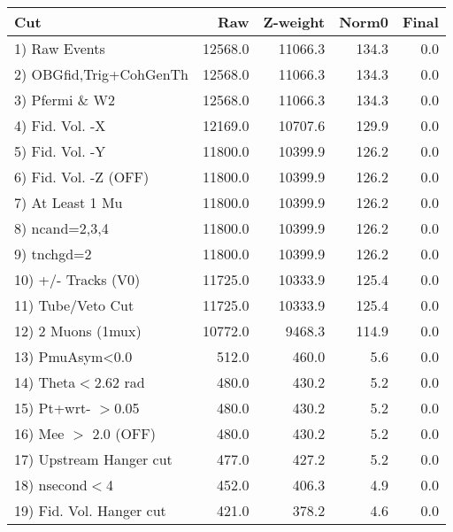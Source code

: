  \begin{table}[h!]\centering
 \begin{tabular}{||l||r|r|r|r||}
 \hline
 \hline
 Cut & Raw & Z-weight & Norm0 & Final \\
 \hline
  1) Raw Events           &     12568.0 &     11066.3 &       134.3 &         0.0 \\
  2) OBGfid,Trig+CohGenTh &     12568.0 &     11066.3 &       134.3 &         0.0 \\
  3) Pfermi \& W2         &     12568.0 &     11066.3 &       134.3 &         0.0 \\
  4) Fid. Vol. -X         &     12169.0 &     10707.6 &       129.9 &         0.0 \\
  5) Fid. Vol. -Y         &     11800.0 &     10399.9 &       126.2 &         0.0 \\
  6) Fid. Vol. -Z (OFF)   &     11800.0 &     10399.9 &       126.2 &         0.0 \\
  7) At Least 1 Mu        &     11800.0 &     10399.9 &       126.2 &         0.0 \\
  8) ncand=2,3,4          &     11800.0 &     10399.9 &       126.2 &         0.0 \\
  9) tnchgd=2             &     11800.0 &     10399.9 &       126.2 &         0.0 \\
 10) +/- Tracks (V0)      &     11725.0 &     10333.9 &       125.4 &         0.0 \\
 11) Tube/Veto Cut        &     11725.0 &     10333.9 &       125.4 &         0.0 \\
 12) 2 Muons (1mux)       &     10772.0 &      9468.3 &       114.9 &         0.0 \\
 13) PmuAsym<0.0          &       512.0 &       460.0 &         5.6 &         0.0 \\
 14) Theta$<$2.62 rad     &       480.0 &       430.2 &         5.2 &         0.0 \\
 15) Pt+wrt- $>$0.05      &       480.0 &       430.2 &         5.2 &         0.0 \\
 16) Mee $>$ 2.0  (OFF)   &       480.0 &       430.2 &         5.2 &         0.0 \\
 17) Upstream Hanger cut  &       477.0 &       427.2 &         5.2 &         0.0 \\
 18) nsecond$<$4          &       452.0 &       406.3 &         4.9 &         0.0 \\
 19) Fid. Vol. Hanger cut &       421.0 &       378.2 &         4.6 &         0.0 \\

\end{tabular}
\end{table}
